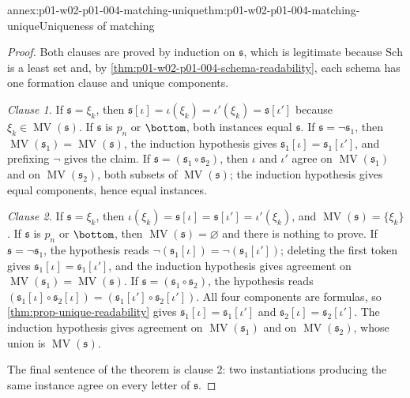 \begin{annexitem}{annex:p01-w02-p01-004-matching-unique}{thm:p01-w02-p01-004-matching-unique}{Uniqueness of matching}
\begin{proof}
Both clauses are proved by induction on \(\mathfrak s\), which is legitimate
because \(\mathrm{Sch}\) is a least set and, by
\cref{thm:p01-w02-p01-004-schema-readability}, each schema has one formation
clause and unique components.

\emph{Clause 1.} If \(\mathfrak s=\xi_k\), then
\(\mathfrak s[\iota]=\iota(\xi_k)=\iota'(\xi_k)=\mathfrak s[\iota']\) because
\(\xi_k\in\operatorname{MV}(\mathfrak s)\). If \(\mathfrak s\) is \(p_n\) or
\(\bottom\), both instances equal \(\mathfrak s\). If
\(\mathfrak s=\neg\mathfrak s_1\), then
\(\operatorname{MV}(\mathfrak s_1)=\operatorname{MV}(\mathfrak s)\), the
induction hypothesis gives \(\mathfrak s_1[\iota]=\mathfrak s_1[\iota']\), and
prefixing \(\neg\) gives the claim. If
\(\mathfrak s=(\mathfrak s_1\circ\mathfrak s_2)\), then \(\iota\) and
\(\iota'\) agree on \(\operatorname{MV}(\mathfrak s_1)\) and on
\(\operatorname{MV}(\mathfrak s_2)\), both subsets of
\(\operatorname{MV}(\mathfrak s)\); the induction hypothesis gives equal
components, hence equal instances.

\emph{Clause 2.} If \(\mathfrak s=\xi_k\), then
\(\iota(\xi_k)=\mathfrak s[\iota]=\mathfrak s[\iota']=\iota'(\xi_k)\), and
\(\operatorname{MV}(\mathfrak s)=\{\xi_k\}\). If \(\mathfrak s\) is \(p_n\) or
\(\bottom\), then \(\operatorname{MV}(\mathfrak s)=\varnothing\) and there is
nothing to prove. If \(\mathfrak s=\neg\mathfrak s_1\), the hypothesis reads
\(\neg(\mathfrak s_1[\iota])=\neg(\mathfrak s_1[\iota'])\); deleting the first
token gives \(\mathfrak s_1[\iota]=\mathfrak s_1[\iota']\), and the induction
hypothesis gives agreement on
\(\operatorname{MV}(\mathfrak s_1)=\operatorname{MV}(\mathfrak s)\). If
\(\mathfrak s=(\mathfrak s_1\circ\mathfrak s_2)\), the hypothesis reads
\((\mathfrak s_1[\iota]\circ\mathfrak s_2[\iota])
=(\mathfrak s_1[\iota']\circ\mathfrak s_2[\iota'])\). All four components are
formulas, so \cref{thm:prop-unique-readability} gives
\(\mathfrak s_1[\iota]=\mathfrak s_1[\iota']\) and
\(\mathfrak s_2[\iota]=\mathfrak s_2[\iota']\). The induction hypothesis gives
agreement on \(\operatorname{MV}(\mathfrak s_1)\) and on
\(\operatorname{MV}(\mathfrak s_2)\), whose union is
\(\operatorname{MV}(\mathfrak s)\).

The final sentence of the theorem is clause 2: two instantiations producing
the same instance agree on every letter of \(\mathfrak s\).
\end{proof}
\end{annexitem}

